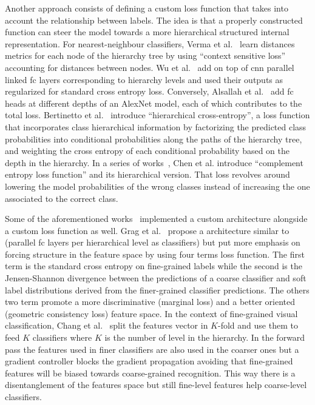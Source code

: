 Another approach consists of defining a custom loss function that takes into
account the relationship between labels. The idea is that a properly
constructed function can steer the model towards a more hierarchical structured
internal representation. For nearest-neighbour classifiers, Verma et
al.~\cite{LearningHierarVerma2012} learn distances metrics for each node of the
hierarchy tree by using ``context sensitive loss'' accounting for distances
between nodes. Wu et al.~\cite{LearningToMakWuHu2016} add on top of
\acrshort{cnn} parallel linked \acrshort{fc} layers corresponding to
hierarchy levels and used their outputs as regularized for standard cross
entropy loss. Conversely, Alsallah et al.~\cite{DoConvolutionaAlsall2017} add
\acrshort{fc} heads at different depths of an AlexNet model, each of which contributes to
the total loss. Bertinetto et al.~\cite{MakingBetterMBertin2019} introduce
``hierarchical cross-entropy'', a loss function that incorporates class
hierarchical information by factorizing the predicted class probabilities into
conditional probabilities along the paths of the hierarchy tree, and weighting
the cross entropy of each conditional probability based on the depth in the
hierarchy. In a series of works~\cite{ComplementObjeChen2019,
ImprovingAdverChen2019, LearningWithHChen2019}, Chen et al. introduce
``complement entropy loss function'' and its hierarchical version. That loss
revolves around lowering the model probabilities of the wrong classes instead
of increasing the one associated to the correct class.

Some of the aforementioned works~\cite{LearningToMakWuHu2016,
DoConvolutionaAlsall2017} implemented a custom architecture alongside a
custom loss function as well. Grag et al.~\cite{LearningHierarGarg2022} propose
a architecture similar to~\cite{LearningToMakWuHu2016} (parallel \acrshort{fc} layers per
hierarchical level as classifiers) but put more emphasis on forcing structure
in the feature space by using four terms loss function. The first term is the
standard cross entropy on fine-grained labels while the second is the
Jensen-Shannon divergence between the predictions of a coarse classifier and
soft label distributions derived from the finer-grained classifier predictions.
The others two term promote a more discriminative (marginal loss) and a better
oriented (geometric consistency loss) feature space. In the context of
fine-grained visual classification, Chang et al.~\cite{YourFlamingoChang2020}
split the features vector in $K$-fold and use them to feed $K$ classifiers
where $K$ is the number of level in the hierarchy. In the forward pass the
features used in finer classifiers are also used in the coarser ones but a
gradient controller blocks the gradient propagation avoiding that fine-grained
features will be biased towards coarse-grained recognition. This way there
is a disentanglement of the features space but still fine-level features help
coarse-level classifiers.

